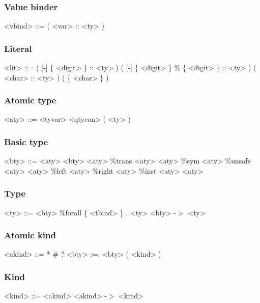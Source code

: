 \subsubsection{Value binder}

\begin{grammar}
<vbind> ::= ( <var> :: <ty> )
\end{grammar}

\subsubsection{Literal}

\begin{grammar}
<lit> ::= ( [-] \{ <digit> \} :: <ty> )
     \alt ( [-] \{ <digit> \} \% \{ <digit> \} :: <ty> )
     \alt ( <char> :: <ty> )
     \alt ( \{ <char> \} )
\end{grammar}

\subsubsection{Atomic type}

\begin{grammar}
<aty> ::= <tyvar>
     \alt <qtycon>
     \alt ( <ty> )
\end{grammar}

\subsubsection{Basic type}

\begin{grammar}
<bty> ::= <aty>
     \alt <bty> <aty>
     \alt \%trans <aty> <aty>
     \alt \%sym <aty>
     \alt \%unsafe <aty> <aty>
     \alt \%left <aty>
     \alt \%right <aty>
     \alt \%inst <aty> <aty>
\end{grammar}

\subsubsection{Type}

\begin{grammar}
<ty> ::= <bty>
    \alt \%forall \{ <tbind> \} . <ty>
    \alt <bty> -$>$ <ty>
\end{grammar}

\subsubsection{Atomic kind}

\begin{grammar}
<akind> ::= *
       \alt \#
       \alt ?
       \alt <bty> :=: <bty>
       \alt ( <kind> )
\end{grammar}

\subsubsection{Kind}

\begin{grammar}
<kind> ::= <akind>
      \alt <akind> -$>$ <kind>
\end{grammar}


